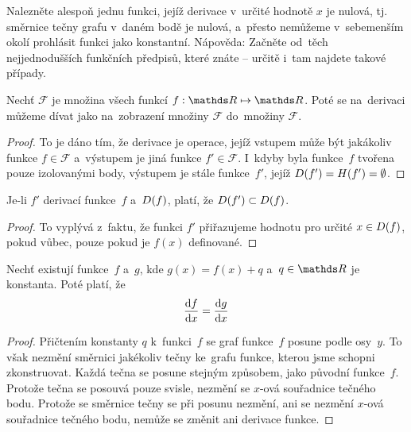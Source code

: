 \begin{exercise}
    Nalezněte alespoň jednu funkci, jejíž derivace v~určité hodnotě $x$ je nulová,
    tj. směrnice tečny grafu v~daném bodě je nulová, a~přesto nemůžeme v~sebemenším
    okolí prohlásit funkci jako konstantní. Nápověda: Začněte od~těch nejjednodušších
    funkčních předpisů, které znáte -- určitě i~tam najdete takové případy.
\end{exercise}

\begin{lemma}
    Nechť $\mathcal{F}$ je množina všech funkcí ${f: \reals \mapsto \reals}$. Poté se
    na~derivaci můžeme dívat jako na~zobrazení množiny $\mathcal{F}$ do~množiny
    $\mathcal{F}$.

    \begin{proof}
        To je dáno tím, že derivace je operace, jejíž vstupem může být jakákoliv
        funkce ${f \in \mathcal{F}}$ a~výstupem je jiná funkce ${f' \in \mathcal{F}}$.
        I~kdyby byla funkce~$f$ tvořena pouze izolovanými body, výstupem je stále
        funkce~$f'$, jejíž ${D(f') = H(f') = \emptyset}$.
    \end{proof}
\end{lemma}

\begin{lemma}
    Je-li $f'$ derivací funkce~$f$ a~$D(f)$, platí, že
    ${D(f') \subset D(f)}$.

    \begin{proof}
        To vyplývá z~faktu, že funkci $f'$ přiřazujeme hodnotu pro určité
        ${x \in D(f)}$, pokud vůbec, pouze pokud je $f(x)$ definované.
    \end{proof}
\end{lemma}

\begin{lemma}
    Nechť existují funkce~$f$ a~$g$, kde ${g(x) = f(x) + q}$
    a~${q \in \reals}$ je konstanta. Poté platí, že
    \begin{equation*}
        \frac{\mathrm{d} f}{\mathrm{d} x} = \frac{\mathrm{d} g}{\mathrm{d} x}
    \end{equation*}

    \begin{proof}
        Přičtením konstanty $q$ k~funkci~$f$ se graf funkce~$f$ posune podle
        osy~$y$. To však nezmění směrnici jakékoliv tečny ke~grafu funkce, kterou
        jsme schopni zkonstruovat. Každá tečna se posune stejným způsobem, jako
        původní funkce~$f$. Protože tečna se posouvá pouze svisle, nezmění se
        $x$-ová souřadnice tečného bodu. Protože se směrnice tečny se při posunu
        nezmění, ani se nezmění $x$-ová souřadnice tečného bodu, nemůže se změnit
        ani derivace funkce.
    \end{proof}
\end{lemma}

